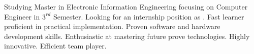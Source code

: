 

\begin{cvparagraph}

Studying Master in Electronic Information Engineering focusing on Computer Engineer in $3^{rd}$ Semester. Looking for an internship position as \applicatename. Fast learner proficient in practical implementation. Proven software and hardware development skills. Enthusiastic at mastering future prove technologies. Highly innovative. Efficient team player.

\end{cvparagraph}
